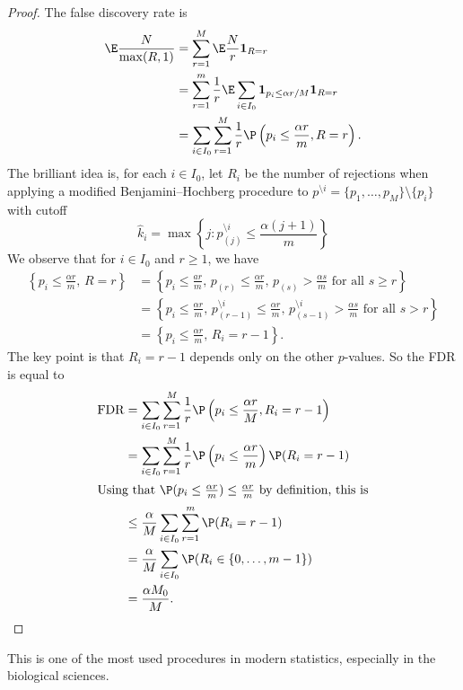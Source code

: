 \documentclass[a4paper]{article}
\begin{document}
\begin{proof}
  The false discovery rate is
  \begin{align*}
    \E \frac{N}{\max (R, 1)} &= \sum_{r = 1}^M \E \frac{N}{r} \mathbf{1}_{R = r}\\
    &= \sum_{r = 1}^m \frac{1}{r} \E \sum_{i \in I_0} \mathbf{1}_{p_i \leq \alpha r/M} \mathbf{1}_{R = r}\\
    &= \sum_{i \in I_0} \sum_{r = 1}^M \frac{1}{r} \P\left(p_i \leq \frac{\alpha r}{m}, R = r\right).
  \end{align*}
  The brilliant idea is, for each $i \in I_0$, let $R_i$ be the number of rejections when applying a modified Benjamini--Hochberg procedure to $p^{\setminus i} = \{p_1, \ldots, p_M\} \setminus \{p_i\}$ with cutoff
  \[
    \hat{k}_i = \max \left\{j: p_{(j)}^{\setminus i} \leq \frac{\alpha (j + 1)}{m}\right\}
  \]
  We observe that for $i \in I_0$ and $r \geq 1$, we have
  \begin{align*}
    \left\{ p_i \leq \frac{\alpha r}{m},\, R = r\right\} &= \left\{ p_i \leq \frac{ar}{m},\, p_{(r)} \leq \frac{\alpha r}{m},\, p_{(s)} > \frac{\alpha s}{m}\text{ for all }s \geq r\right\}\\
    &= \left\{p_i \leq \frac{\alpha r}{m},\, p_{(r - 1)}^{\setminus i} \leq \frac{\alpha r}{m},\, p^{\setminus i}_{(s - 1)} > \frac{\alpha s}{m}\text{ for all }s > r\right\}\\
    &= \left\{p_i \leq \frac{\alpha r}{m},\, R_i = r - 1\right\}.
  \end{align*}
  The key point is that $R_i = r - 1$ depends only on the other $p$-values. So the FDR is equal to
  \begin{align*}
    \mathrm{FDR} &= \sum_{i \in I_0} \sum_{r = 1}^M \frac{1}{r} \P\left(p_i \leq \frac{\alpha r}{M}, R_i = r - 1\right)\\
    &= \sum_{i \in I_0} \sum_{r = 1}^M \frac{1}{r} \P \left(p_i \leq \frac{\alpha r}{m}\right) \P(R_i = r - 1)\\
    \intertext{Using that $\P(p_i \leq \frac{\alpha r}{m}) \leq \frac{\alpha r}{m}$ by definition, this is}
    &\leq \frac{\alpha }{M} \sum_{i \in I_0} \sum_{r = 1}^m \P(R_i = r - 1)\\
    &= \frac{\alpha}{M} \sum_{i \in I_0} \P(R_i \in \{0, \ldots, m - 1\})\\
    &= \frac{\alpha M_0}{M}.\qedhere
  \end{align*}
\end{proof}
This is one of the most used procedures in modern statistics, especially in the biological sciences.
\end{document}
